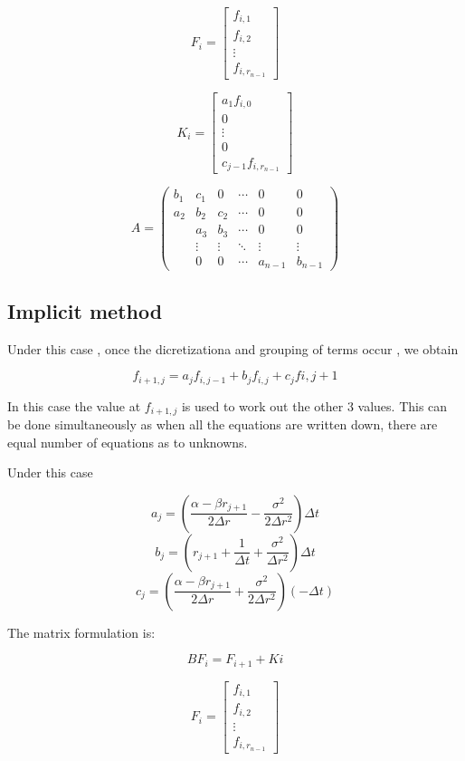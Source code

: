 \documentclass[12pt,a4paper]{article}
\begin{document}
$$F_{i}= \begin{bmatrix}
			f_{i,1} \\
			f_{i,2} \\
			\vdots \\
			f_{i,r_{n-1}}
		\end{bmatrix}
$$
     
$$K_{i}= \begin{bmatrix}
			a_{1}f_{i,0} \\
			0 \\
			\vdots \\
			0 \\
			c_{j-1}f_{i, r_{n-1}}
		\end{bmatrix}  $$
		
		
$$ A= \left( \begin{array}{cccccc}
b_{1} & c_{1} & 0 & \cdots  & 0 & 0\\
a_{2} & b_{2} & c_{2} &\cdots & 0 & 0 \\
 & a_{3} & b_{3} & \cdots & 0 & 0  \\
 & \vdots &\vdots & \ddots & \vdots & \vdots \\ 
 & 0 & 0 & \cdots & a_{n-1} & b_{n-1} \end{array} \right) $$
 
 
 
\subsection{ Implicit method}

Under this case , once the dicretizationa and grouping of terms occur , we obtain

$$f_{i+1,j}= a_{j}f_{i,j-1}+b_{j}f_{i,j}+c_{j}f{i,j+1} $$

In this case the value at $f_{i+1,j}$ is used to work out the other 3 values. This can be done simultaneously as when all the equations are written down, there are equal number of equations as to unknowns.


Under this case

$$a_{j}= (\frac{\alpha-\beta r_{j+1}}{2\Delta r} - \frac{\sigma^2}{2\Delta r^2})\Delta t$$ 
$$b_{j}= (r_{j+1}+\frac{1}{\Delta t} + \frac{\sigma^2}{\Delta r ^2})\Delta t$$
$$c_{j}= (\frac{\alpha-\beta r_{j+1}}{2\Delta r} + \frac{\sigma^2}{2\Delta r^2})(-\Delta t) $$

The matrix formulation is:

$$ BF_{i}= F_{i+1}+K{i}$$


$$F_{i}= \begin{bmatrix}
f_{i,1} \\
f_{i,2} \\
\vdots \\
f_{i,r_{n-1}}
\end{bmatrix}
$$
\end{document}
